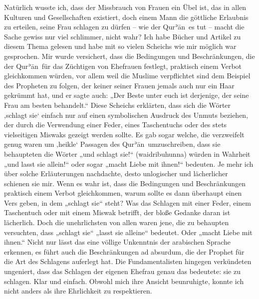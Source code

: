\documentclass[12pt]{memoir}
\def\´{ʾ} %
\def \Quran{Qur\-\´ān} %
\begin{document}
Natürlich wusste ich, dass der Missbrauch von Frauen ein Übel ist,
das in allen Kulturen und Gesellschaften existiert,
doch einem Mann die göttliche Erlaubnis zu erteilen,
seine Frau schlagen zu dürfen – wie der \Quran\ es tut –
macht die Sache gewiss nur viel schlimmer, nicht wahr?
Ich habe Bücher und Artikel zu diesem Thema gelesen
und habe mit so vielen Scheichs wie mir möglich war gesprochen.
Mir wurde versichert, dass die Bedingungen und Beschränkungen,
die der \Quran\ für das Züchtigen von Ehefrauen festlegt,
praktisch einem Verbot gleichkommen würden,
vor allem weil die Muslime verpflichtet sind
dem Beispiel des Propheten zu folgen,
der keiner seiner Frauen jemals auch nur ein Haar gekrümmt hat\footnotemark,
und er sagte auch:
„Der Beste unter euch ist derjenige, der seine Frau am besten behandelt.“
Diese Scheichs erklärten, dass sich die Wörter ‚schlagt sie‘
einfach nur auf einen symbolischen Ausdruck des Unmuts beziehen,
der durch die Verwendung einer Feder, eines Taschentuchs
oder des stets vielseitigen Miswaks gezeigt werden sollte.
Es gab sogar welche,
die verzweifelt genug waren um ‚heikle‘ Passagen des \Quran\ umzuschreiben,
dass sie behaupteten die Wörter „und schlagt sie!“ (waidribuhunna)
würden in Wahrheit „und lasst sie allein!“
oder sogar „macht Liebe mit ihnen!“ bedeuten.
Je mehr ich über solche Erläuterungen nachdachte,
desto unlogischer und lächerlicher schienen sie mir.
Wenn es wahr ist, dass die Bedingungen und Beschränkungen
praktisch einem Verbot gleichkommen,
warum sollte es dann überhaupt einen Vers geben, in dem „schlagt sie“ steht?
Was das Schlagen mit einer Feder,
einem Taschentuch oder mit einem Miswak betrifft,
der bloße Gedanke daran ist lächerlich.
Doch die unehrlichsten von allen waren jene,
die zu behaupten versuchten, dass „schlagt sie“ „lasst sie alleine“
bedeutet.
Oder „macht Liebe mit ihnen.“
Nicht nur lässt das eine völlige Unkenntnis der arabischen Sprache erkennen,
es führt auch die Beschränkungen ad absurdum,
die der Prophet für die Art des Schlagens auferlegt hat.
Die Fundamentalisten hingegen verkündeten ungeniert,
dass das Schlagen der eigenen Ehefrau genau das bedeutete:
sie zu schlagen. Klar und einfach.
Obwohl mich ihre Ansicht beunruhigte,
konnte ich nicht anders als ihre Ehrlichkeit zu respektieren.

\end{document}
